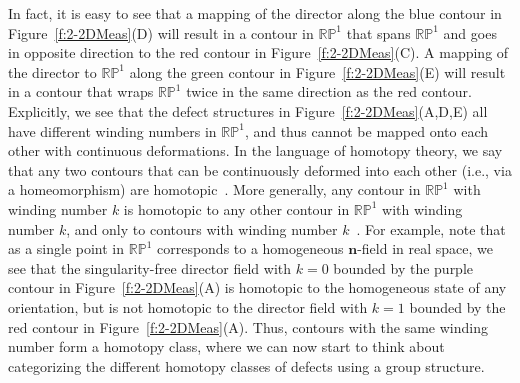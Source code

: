 In fact, it is easy to see that a mapping of the director along the blue contour in Figure~\ref{f:2-2DMeas}(D) will result in a contour in $\mathbb{R}\mathbb{P}^1$ that spans $\mathbb{RP}^1$ and goes in opposite direction to the red contour in  Figure~\ref{f:2-2DMeas}(C).
A mapping of the director to $\mathbb{R}\mathbb{P}^1$ along the green contour in Figure~\ref{f:2-2DMeas}(E) will result in a contour that wraps $\mathbb{R}\mathbb{P}^1$ twice in the same direction as the red contour.
Explicitly, we see that the defect structures in Figure~\ref{f:2-2DMeas}(A,D,E) all have different winding numbers in $\mathbb{R}\mathbb{P}^1$, and thus cannot be mapped onto each other with continuous deformations.
In the language of homotopy theory, we say that any two contours that can be continuously deformed into each other (i.e., via a homeomorphism) are homotopic~\cite{RN196}.
More generally, any contour in $\mathbb{R}\mathbb{P}^1$ with winding number $k$ is homotopic to any other contour in $\mathbb{R}\mathbb{P}^1$ with winding number $k$, and only to contours with winding number $k$~\cite{RN196,RN153,RN236}.
For example, note that as a single point in $\mathbb{R}\mathbb{P}^1$ corresponds to a homogeneous $\mathbf{n}$-field in real space, we see that the singularity-free director field with $k=0$ bounded by the purple contour in Figure~\ref{f:2-2DMeas}(A) is homotopic to the homogeneous state of any orientation, but is not homotopic to the director field with $k=1$ bounded by the red contour in Figure~\ref{f:2-2DMeas}(A).
Thus, contours with the same winding number form a homotopy class, where we can now start to think about categorizing the different homotopy classes of defects using a group structure.

